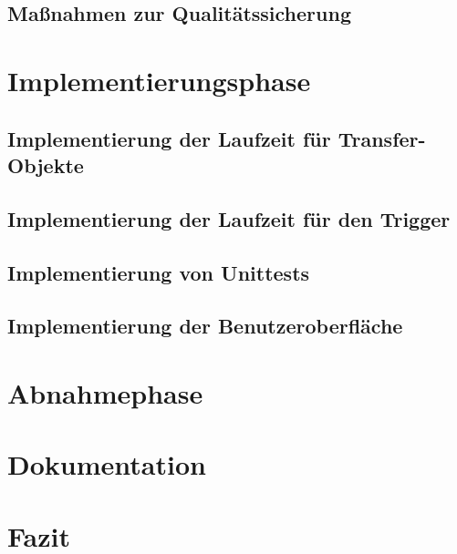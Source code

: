 \documentclass[12pt]{article} %
\begin{document}
	\subsection{Maßnahmen zur Qualitätssicherung}
	\label{subsec:massnahmenqualitaetssicherung}
	\massnahmenQualitaetssicherungText
		
	\section{Implementierungsphase}
	\label{sec:implementierungsphase}
	\implementierungproviderText
	
		\subsection{Implementierung der Laufzeit für Transfer-Objekte}
		\label{subsec:implementierunglaufzeittransfer}
		\implementierunglaufzeittransferText
		
		\subsection{Implementierung der Laufzeit für den Trigger}
		\label{subsec:implementierunglaufzeittrigger}
		\implementierunglaufzeittriggerText
		
		\subsection{Implementierung von Unittests}
		\label{subsec:implementierungunittests}
		\implementierungunittestsText
		
		\subsection{Implementierung der Benutzeroberfläche}
		\label{subsec:implementierungbenuzteroberflaeche}
		\implementierungbenuzteroberflaecheText
	
	\section{Abnahmephase}
	\label{sec
	}
	\abnahmephaseText
	
	\section{Dokumentation}
	\label{sec
	}
	\dokumentationText
	
	\section{Fazit}
	\label{sec
	}
	\fazitText
\end{document}
